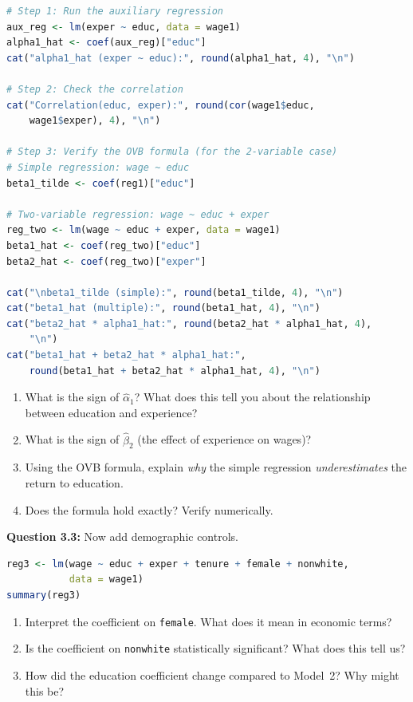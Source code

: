 \documentclass[11pt,letterpaper]{article}
\begin{document}
\begin{lstlisting}[language=R]
# Step 1: Run the auxiliary regression
aux_reg <- lm(exper ~ educ, data = wage1)
alpha1_hat <- coef(aux_reg)["educ"]
cat("alpha1_hat (exper ~ educ):", round(alpha1_hat, 4), "\n")

# Step 2: Check the correlation
cat("Correlation(educ, exper):", round(cor(wage1$educ,
    wage1$exper), 4), "\n")

# Step 3: Verify the OVB formula (for the 2-variable case)
# Simple regression: wage ~ educ
beta1_tilde <- coef(reg1)["educ"]

# Two-variable regression: wage ~ educ + exper
reg_two <- lm(wage ~ educ + exper, data = wage1)
beta1_hat <- coef(reg_two)["educ"]
beta2_hat <- coef(reg_two)["exper"]

cat("\nbeta1_tilde (simple):", round(beta1_tilde, 4), "\n")
cat("beta1_hat (multiple):", round(beta1_hat, 4), "\n")
cat("beta2_hat * alpha1_hat:", round(beta2_hat * alpha1_hat, 4),
    "\n")
cat("beta1_hat + beta2_hat * alpha1_hat:",
    round(beta1_hat + beta2_hat * alpha1_hat, 4), "\n")
\end{lstlisting}

\begin{enumerate}[label=(\alph*)]
\item What is the sign of $\hat{\alpha}_1$? What does this tell you about the relationship between education and experience?
\item What is the sign of $\hat{\beta}_2$ (the effect of experience on wages)?
\item Using the OVB formula, explain \textit{why} the simple regression \textit{underestimates} the return to education.
\item Does the formula hold exactly? Verify numerically.
\end{enumerate}

\vspace{4cm}

\textbf{Question 3.3:} Now add demographic controls.

\begin{lstlisting}[language=R]
reg3 <- lm(wage ~ educ + exper + tenure + female + nonwhite,
           data = wage1)
summary(reg3)
\end{lstlisting}

\begin{enumerate}[label=(\alph*)]
\item Interpret the coefficient on \texttt{female}. What does it mean in economic terms?
\item Is the coefficient on \texttt{nonwhite} statistically significant? What does this tell us?
\item How did the education coefficient change compared to Model~2? Why might this be?
\end{enumerate}
\end{document}
